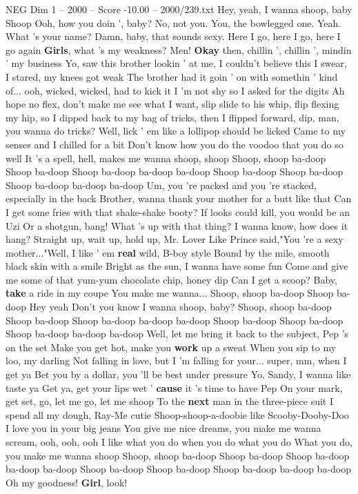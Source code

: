 \begin{textsample}{NEG Dim 1 – 2000 – Score -10.00 – 2000/239.txt}  \label{ex:f1_neg_004}
Hey, yeah, I wanna shoop, baby Shoop Ooh, how you doin ', baby?
No, not you.
You, the bowlegged one.
Yeah.
What 's your name?
Damn, baby, that sounds sexy.
Here I go, here I go, here I go again \textbf{Girls}, what 's my weakness?
Men! \textbf{Okay} then, chillin ', chillin ', mindin ' my business Yo, saw this brother lookin ' at me, I couldn't believe this I swear, I stared, my knees got weak The brother had it goin ' on with somethin ' kind of... ooh, wicked, wicked, had to kick it I 'm not shy so I asked for the digits Ah hope no flex, don't make me see what I want, slip slide to his whip, flip flexing my hip, so I dipped back to my bag of tricks, then I flipped forward, dip, man, you wanna do tricks?
Well, lick ' em like a lollipop should be licked Came to my senses and I chilled for a bit Don't know how you do the voodoo that you do so well It 's a spell, hell, makes me wanna shoop, shoop Shoop, shoop ba-doop Shoop ba-doop Shoop ba-doop ba-doop ba-doop Shoop ba-doop Shoop ba-doop Shoop ba-doop ba-doop ba-doop Um, you 're packed and you 're stacked, especially in the back Brother, wanna thank your mother for a butt like that Can I get some fries with that shake-shake booty?
If looks could kill, you would be an Uzi Or a shotgun, bang!
What 's up with that thing?
I wanna know, how does it hang?
Straight up, wait up, hold up, Mr.
Lover Like Prince said,"You 're a sexy mother..."Well, I like ' em \textbf{real} wild, B-boy style Bound by the mile, smooth black skin with a smile Bright as the sun, I wanna have some fun Come and give me some of that yum-yum chocolate chip, honey dip Can I get a scoop?
Baby, \textbf{take} a ride in my coupe You make me wanna...
Shoop, shoop ba-doop Shoop ba-doop Hey yeah Don't you know I wanna shoop, baby?
Shoop, shoop ba-doop Shoop ba-doop Shoop ba-doop ba-doop ba-doop Shoop ba-doop Shoop ba-doop Shoop ba-doop ba-doop ba-doop Well, let me bring it back to the subject, Pep 's on the set Make you get hot, make you \textbf{work} up a sweat When you sip to my loo, my darling Not falling in love, but I 'm falling for your... super, mm, when I get ya Bet you by a dollar, you 'll be best under pressure Yo, Sandy, I wanna like taste ya Get ya, get your lips wet ' \textbf{cause} it 's time to have Pep On your mark, get set, go, let me go, let me shoop To the \textbf{next} man in the three-piece suit I spend all my dough, Ray-Me cutie Shoop-shoop-a-doobie like Scooby-Dooby-Doo I love you in your big jeans You give me nice dreams, you make me wanna scream, ooh, ooh, ooh I like what you do when you do what you do What you do, you make me wanna shoop Shoop, shoop ba-doop Shoop ba-doop Shoop ba-doop ba-doop ba-doop Shoop ba-doop Shoop ba-doop Shoop ba-doop ba-doop ba-doop Oh my goodness! \textbf{Girl}, look!

\end{textsample}

